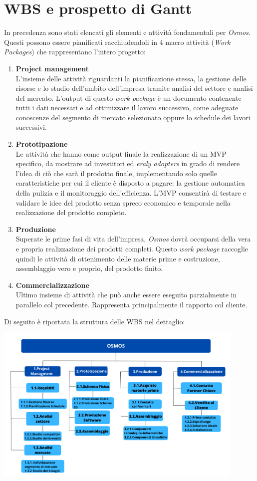 \documentclass[a4paper, 12pt]{article}
\begin{document}
	\section{WBS e prospetto di Gantt}
	In precedenza sono stati elencati gli elementi e attività fondamentali per \emph{Osmos}. Questi possono essere pianificati racchiudendoli in 4 macro attività (\emph{Work Packages}) che rappresentano l'intero progetto:
	\begin{enumerate}
		\item \textbf{Project management}\\
			  L'insieme delle attività riguardanti la pianificazione stessa, la gestione delle risorse e lo studio dell'ambito dell'impresa tramite analisi del settore e analisi del mercato. L'output di questo \emph{work package} è un documento contenente tutti i dati necessari e ad ottimizzare il lavoro successivo, come adeguate conoscenze del segmento di mercato selezionato oppure lo schedule dei lavori successivi.
		\item \textbf{Prototipazione}\\
			  Le attività che hanno come output finale la realizzazione di un MVP specifico, da mostrare ad investitori ed \emph{eraly adopters} in grado di rendere l'idea di ciò che sarà il prodotto finale, implementando solo quelle caratteristiche per cui il cliente è disposto a pagare: la gestione automatica della pulizia e il monitoraggio dell'efficienza. L'MVP consentirà di testare e validare le idee del prodotto senza spreco economico e temporale nella realizzazione del prodotto completo.
		\item \textbf{Produzione}\\
			  Superate le prime fasi di vita dell'impresa, \emph{Osmos} dovrà occuparsi della vera e propria realizzazione dei prodotti completi. Questo \emph{work package} raccoglie quindi le attività di ottenimento delle materie prime e costruzione, assemblaggio vero e proprio, del prodotto finito.
		\item \textbf{Commercializzazione}\\
			  Ultimo insieme di attività che può anche essere eseguito parzialmente in parallelo col precedente. Rappresenta principalmente il rapporto col cliente.
	\end{enumerate}
	Di seguito è riportata la struttura delle WBS nel dettaglio:
	\begin{center}
		\includegraphics[width=0.9\textwidth]{Images/WBS.png}
	\end{center}
\end{document}
